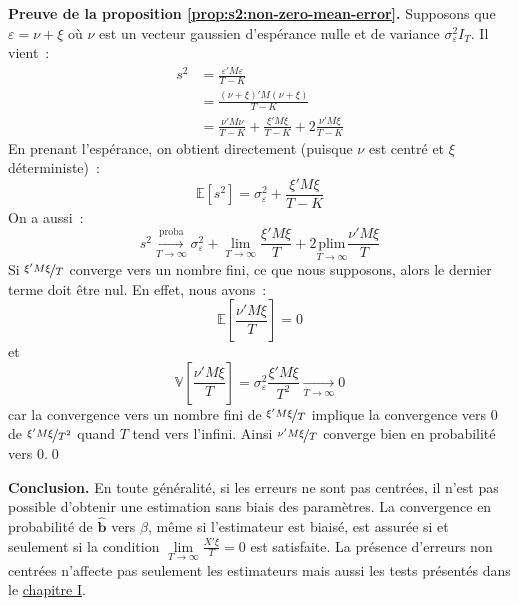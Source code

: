 \documentclass[10pt]{beamer}
\newcommand{\plim}{\overset{\text{proba}}{\underset{T\rightarrow\infty}{\longrightarrow}}}
\newcommand{\epsvar}{\sigma_{\varepsilon}^2}
\theoremstyle{plain}
\begin{document}
\begin{notes}
  \textbf{Preuve de la proposition \ref{prop:s2:non-zero-mean-error}.} Supposons que $\varepsilon = \nu + \xi$ où $\nu$ est un vecteur gaussien d'espérance nulle et de variance $\sigma_{\varepsilon}^2I_T$. Il vient~:
  \[
    \begin{split}
      s^2 &= \frac{\varepsilon'M\varepsilon}{T-K}\\
          &= \frac{\left(\nu+\xi\right)'M\left(\nu+\xi\right)}{T-K}\\
          &= \frac{\nu'M\nu}{T-K} + \frac{\xi'M\xi}{T-K} + 2\frac{\nu'M\xi}{T-K}
    \end{split}
  \]
  En prenant l'espérance, on obtient directement (puisque $\nu$ est centré et $\xi$ déterministe)~:
  \[
    \mathbb E\left[ s^2 \right] = \epsvar + \frac{\xi'M\xi}{T-K}
  \]
  On a aussi~:
  \[
    s^2 \plim \epsvar + \underset{T\rightarrow\infty}{\lim}\frac{\xi'M\xi}{T} + 2\underset{T\rightarrow\infty}{\text{plim}}\frac{\nu'M\xi}{T}
  \]
  Si $\nicefrac{\xi'M\xi}{T}$ converge vers un nombre fini, ce que nous supposons, alors le dernier terme doit être nul. En effet, nous avons~:
  \[
    \mathbb E\left[ \frac{\nu'M\xi}{T} \right] = 0
  \]
  et
  \[
    \mathbb V\left[ \frac{\nu'M\xi}{T} \right] = \epsvar \frac{\xi'M\xi}{T^2} \underset{T\rightarrow\infty}{\longrightarrow} 0
    \]
    car la convergence vers un nombre fini de $\nicefrac{\xi'M\xi}{T}$ implique la convergence vers 0 de $\nicefrac{\xi'M\xi}{T^2}$ quand $T$ tend vers l'infini. Ainsi $\nicefrac{\nu'M\xi}{T}$ converge bien en probabilité vers 0.\qed

    \bigskip

    \textbf{Conclusion.} En toute généralité, si les erreurs ne sont pas centrées, il n'est pas possible d'obtenir une estimation sans biais des paramètres. La convergence en probabilité de $\hat{\mathbf b}$ vers $\beta$, même si l'estimateur est biaisé, est assurée si et seulement si la condition $\underset{T\rightarrow\infty}{\lim}\frac{X'\xi}{T}=0$ est satisfaite. La présence d'erreurs non centrées n'affecte pas seulement les estimateurs mais aussi les tests présentés dans le \href{https://le-mans.adjemian.eu/econometrics/chapitre-1.pdf}{chapitre I}.

\end{notes}
\end{document}
